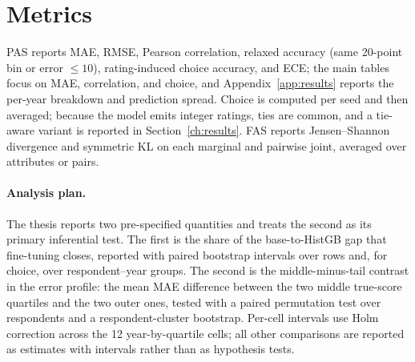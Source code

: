 \section{Metrics}

PAS reports MAE, RMSE, Pearson correlation, relaxed accuracy (same 20-point bin
or error $\le10$), rating-induced choice accuracy, and ECE; the main tables focus
on MAE, correlation, and choice, and Appendix~\ref{app:results} reports the
per-year breakdown and prediction spread. Choice is computed per seed and then
averaged; because the model emits integer ratings, ties are common, and a
tie-aware variant is reported in Section~\ref{ch:results}. FAS reports
Jensen--Shannon divergence \citep{lin1991js} and symmetric KL on each marginal
and pairwise joint, averaged over attributes or pairs.

\paragraph{Analysis plan.} The thesis reports two pre-specified quantities and
treats the second as its primary inferential test. The first is the share of the
base-to-HistGB gap that fine-tuning closes, reported with paired bootstrap
intervals over rows and, for choice, over respondent--year groups. The second is
the middle-minus-tail contrast in the error profile: the mean MAE difference
between the two middle true-score quartiles and the two outer ones, tested with a
paired permutation test over respondents and a respondent-cluster bootstrap.
Per-cell intervals use Holm correction across the 12 year-by-quartile cells; all
other comparisons are reported as estimates with intervals rather than as
hypothesis tests.
